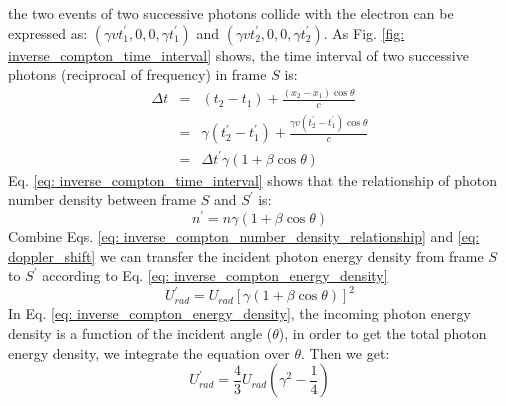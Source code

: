 \documentclass[12pt]{report}
\begin{document}
            the two events of two successive photons collide with the electron can be 
            expressed as:
            $\left(\gamma v t_{1}^{\prime}, 0, 0, \gamma t_{1}^{\prime}\right)$ and 
            $\left(\gamma v t_{2}^{\prime}, 0, 0, \gamma t_{2}^{\prime}\right)$. 
            As Fig. \ref{fig: inverse_compton_time_interval} shows, the time interval of two 
            successive photons (reciprocal of frequency) in frame $S$ is: 
            \begin{eqnarray}
              \label{eq: inverse_compton_time_interval}
              \Delta t &=& \left(t_2 - t_1\right) + \frac{\left(x_2 - x_1\right) \cos{\theta}}{c}  \nonumber \\
                      &=& \gamma \left(t_{2}^{\prime} - t_{1}^{\prime}\right) + \frac{\gamma v \left(t_{2}^{\prime} - t_{1}^{\prime}\right) \cos{\theta}}{c} \nonumber \\
                      &=&  \Delta t^{\prime} \gamma \left(1 + \beta \cos{\theta}\right) 
            \end{eqnarray}
            Eq. \ref{eq: inverse_compton_time_interval} shows that the relationship of photon 
            number density between frame $S$ and $S^{\prime}$ is:
            \begin{equation}
              \label{eq: inverse_compton_number_density_relationship}
              n^{\prime} = n \gamma \left(1 + \beta \cos{\theta}\right) 
            \end{equation}
            Combine Eqs. \ref{eq: inverse_compton_number_density_relationship} and 
            \ref{eq: doppler_shift} we can transfer the incident photon energy density from 
            frame $S$ to $S^{\prime}$ according to Eq. \ref{eq: inverse_compton_energy_density}
            \begin{equation}
              \label{eq: inverse_compton_energy_density}
              U_{rad}^{\prime} = U_{rad} \left[\gamma \left(1 + \beta \cos{\theta}\right)\right]^{2}
            \end{equation}
            In Eq. \ref{eq: inverse_compton_energy_density}, the incoming photon energy density 
            is a function of the incident angle ($\theta$), in order to get the total photon 
            energy density, we integrate the equation over $\theta$. Then we get: 
            \begin{equation}
              \label{eq: inverse_compton_energy_density_total}
              U_{rad}^{\prime} = \frac{4}{3} U_{rad} \left(\gamma^2 - \frac{1}{4}\right)
            \end{equation}
\end{document}
